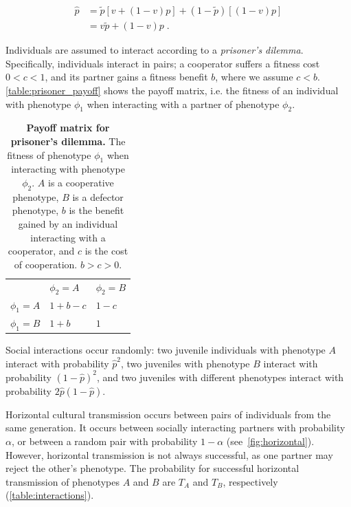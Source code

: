 \documentclass[12pt]{extarticle}
\begin{document}
\begin{equation}\label{eq:horizontal}
\begin{aligned}
\hat{p}
& = \tilde{p} [v + (1-v)p] + (1-\tilde{p}) [(1-v)p] \\
& = v \tilde{p} + (1-v) p \;.
\end{aligned}
\end{equation}

Individuals are assumed to interact according to a \emph{prisoner's dilemma}.
Specifically, individuals interact in pairs; a cooperator suffers a fitness cost $0<c<1$, and its partner gains a fitness benefit $b$, where we assume $c<b$. \autoref{table:prisoner_payoff} shows the payoff matrix, i.e. the fitness of an individual with phenotype $\phi_1$ when interacting with a partner of phenotype $\phi_2$.

\bigskip
\begin{table}[h]
\centering
\caption{\textbf{Payoff matrix for prisoner's dilemma.}
The fitness of phenotype $\phi_1$ when interacting with phenotype $\phi_2$. $A$ is a cooperative phenotype, $B$ is a defector phenotype, $b$ is the benefit gained by an individual interacting with a cooperator, and $c$ is the cost of cooperation. $b>c>0$.
}
\begin{tabular}{lll}
\toprule
           & $\phi_2=A$ & $\phi_2=B$ \\ \cmidrule(r){1-3}
$\phi_1=A$ & $1+b-c$ & $1-c$ \\
$\phi_1=B$ & $1+b$   & $1$
\\ \bottomrule
\end{tabular}
\label{table:prisoner_payoff}
\end{table}
\bigskip


Social interactions occur randomly:
two juvenile individuals with phenotype $A$ interact with probability $\hat{p}^2$, two juveniles with phenotype $B$ interact with probability $(1-\hat{p})^2$, and two juveniles with different phenotypes interact with probability $2\hat{p}(1-\hat{p})$. 

Horizontal cultural transmission occurs between pairs of individuals from the same generation. 
It occurs between socially interacting partners with probability $\alpha$, or between a random pair with probability $1-\alpha$ (see~\autoref{fig:horizontal}).
However, horizontal transmission is not always successful, as one partner may reject the other's phenotype. The probability for successful horizontal transmission of phenotypes $A$ and $B$ are $T_A$ and $T_B$, respectively (\autoref{table:interactions}).
\end{document}
